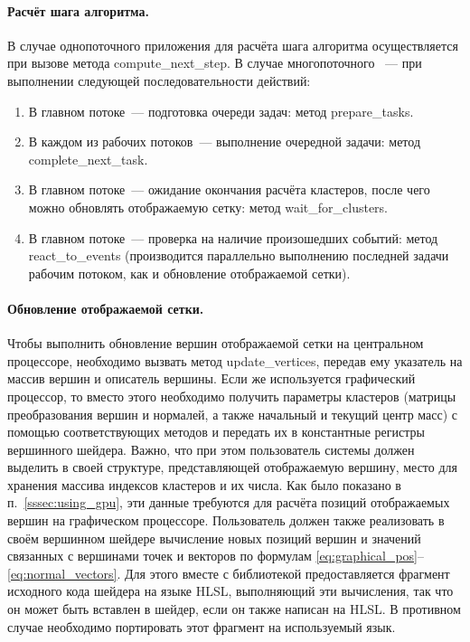 \documentclass[a4paper, 14pt, titlepage]{extarticle}
\begin{document}
        \paragraph{Расчёт шага алгоритма.}
        В случае однопоточного приложения для расчёта шага алгоритма осуществляется при вызове метода
        compute\_next\_step. В случае многопоточного ~--- при выполнении следующей
        последовательности действий:
        \begin{enumerate}
          \item В главном потоке~--- подготовка очереди задач: метод prepare\_tasks.
          \item В каждом из рабочих потоков~--- выполнение очередной задачи: метод complete\_next\_task.
          \item В главном потоке~--- ожидание окончания расчёта кластеров, после чего можно
            обновлять отображаемую сетку: метод wait\_for\_clusters.
          \item В главном потоке~--- проверка на наличие произошедших событий: метод
            react\_to\_events (производится параллельно выполнению последней задачи рабочим потоком,
            как и обновление отображаемой сетки).
        \end{enumerate}

        \paragraph{Обновление отображаемой сетки.}
        Чтобы выполнить обновление вершин отображаемой сетки на центральном процессоре, необходимо вызвать метод
        update\_vertices, передав ему указатель на массив вершин и описатель вершины.
        Если же используется графический процессор, то вместо этого необходимо
        получить параметры кластеров (матрицы преобразования вершин и нормалей, а также начальный и
        текущий центр масс) с помощью соответствующих методов и передать их в константные регистры
        вершинного шейдера. Важно, что при этом пользователь системы должен выделить в своей структуре,
        представляющей отображаемую вершину, место для хранения массива индексов кластеров и их
        числа. Как было показано в п.~\ref{sssec:using_gpu}, эти данные требуются для расчёта
        позиций отображаемых вершин на графическом процессоре. Пользователь должен также реализовать
        в своём вершинном шейдере вычисление новых позиций вершин и значений связанных с вершинами
        точек и векторов по формулам \eqref{eq:graphical_pos}--\eqref{eq:normal_vectors}.
        Для этого вместе с библиотекой предоставляется фрагмент исходного кода шейдера на языке HLSL,
        выполняющий эти вычисления, так что он может быть вставлен в шейдер, если он также написан
        на HLSL. В противном случае необходимо портировать этот фрагмент на используемый язык.
\end{document}
